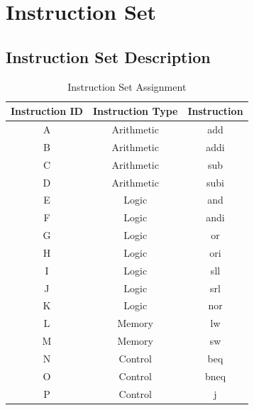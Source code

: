 \documentclass[12pt]{article}
\begin{document}
\newpage
\section{\large{Instruction Set}}
\label{IS}
\subsection{Instruction Set Description}
\begin{table}[h]
    \centering
   \begin{tabular}{|c|c|c|}
    \hline
    Instruction ID & Instruction Type & Instruction \\
    \hline
    A & Arithmetic & add \\
    \hline
    B & Arithmetic & addi \\
    \hline
    C & Arithmetic & sub \\
    \hline
    D & Arithmetic & subi \\
    \hline
    E & Logic & and \\
    \hline
    F & Logic & andi \\
    \hline
    G & Logic & or \\
    \hline
    H & Logic & ori \\
    \hline
    I & Logic & sll \\
    \hline
    J & Logic & srl \\
    \hline
    K & Logic & nor \\
    \hline
    L & Memory & lw \\
    \hline
    M & Memory & sw \\
    \hline
    N & Control & beq \\
    \hline
    O & Control & bneq \\
    \hline
    P & Control & j \\
    \hline
\end{tabular}
\caption{Instruction Set Assignment}
\end{table}
\end{document}
